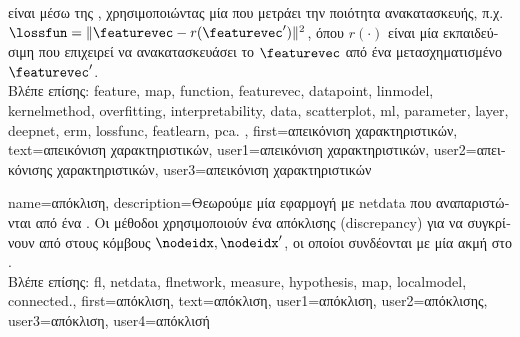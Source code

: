 {{		  \foreignlanguage{greek}{είναι μέσω της} , \foreignlanguage{greek}{χρησιμοποιώντας μία}  
		 \foreignlanguage{greek}{που μετράει την ποιότητα ανακατασκευής, π.χ.
 		$\lossfun = \|\featurevec - r(\featurevec')\|^2$, όπου $r(\cdot)$ είναι μία εκπαιδεύσιμη}  \foreignlanguage{greek}{που 
		επιχειρεί να ανακατασκευάσει το $\featurevec$ από ένα μετασχηματισμένο}  $\featurevec'$.
				\\
		\foreignlanguage{greek}{Βλέπε επίσης:} \gls{feature}, \gls{map}, \gls{function}, \gls{featurevec}, \gls{datapoint}, \gls{linmodel}, \gls{kernelmethod}, 
		\gls{overfitting}, \gls{interpretability}, \gls{data}, \gls{scatterplot}, \gls{ml}, \gls{parameter}, \gls{layer}, \gls{deepnet}, \gls{erm}, \gls{lossfunc}, 
		\gls{featlearn}, \gls{pca}. },
	first={\foreignlanguage{greek}{απεικόνιση χαρακτηριστικών}},
	text={\foreignlanguage{greek}{απεικόνιση χαρακτηριστικών}},
	user1={\foreignlanguage{greek}{απεικόνιση χαρακτηριστικών}}, %
  	user2={\foreignlanguage{greek}{απεικόνισης χαρακτηριστικών}}, %
	user3={\foreignlanguage{greek}{απεικόνιση χαρακτηριστικών}} %
}

{name={\foreignlanguage{greek}{απόκλιση}},
	description={\foreignlanguage{greek}{Θεωρούμε μία εφαρμογή} 
		 \foreignlanguage{greek}{με} \gls{netdata} \foreignlanguage{greek}{που αναπαριστώνται από ένα}
		. \foreignlanguage{greek}{Οι μέθοδοι}  \foreignlanguage{greek}{χρησιμοποιούν 
		ένα}  \foreignlanguage{greek}{απόκλισης} (discrepancy) \foreignlanguage{greek}{για να συγκρίνουν} 
		  \foreignlanguage{greek}{από}  \foreignlanguage{greek}{στους 
		κόμβους} $\nodeidx,\nodeidx'$, \foreignlanguage{greek}{οι οποίοι συνδέονται με μία ακμή στο} . 
		\\
		\foreignlanguage{greek}{Βλέπε επίσης:} \gls{fl}, \gls{netdata}, \gls{flnetwork}, \gls{measure}, \gls{hypothesis}, \gls{map}, 
		\gls{localmodel}, \gls{connected}.},
	first={\foreignlanguage{greek}{απόκλιση}},
	text={\foreignlanguage{greek}{απόκλιση}},
	user1={\foreignlanguage{greek}{απόκλιση}}, %
	user2={\foreignlanguage{greek}{απόκλισης}}, %
	user3={\foreignlanguage{greek}{απόκλιση}}, %
	user4={\foreignlanguage{greek}{απόκλισή}} %
}

